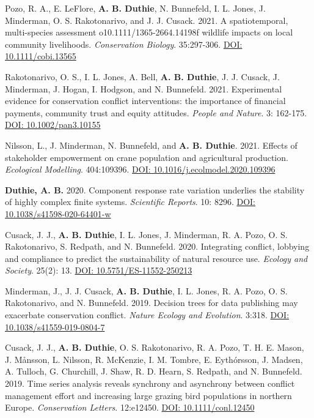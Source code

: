 \documentclass[letterpaper]{article}
\begin{document}
\begin{etaremune}
\item Pozo, R. A., E. LeFlore, {\bf A. B. Duthie}, N. Bunnefeld, I. L. Jones, J. Minderman, O. S. Rakotonarivo, and J. J. Cusack. 2021. A spatiotemporal, multi-species assessment o10.1111/1365-2664.14198f wildlife impacts on local community livelihoods. {\it Conservation Biology}. 35:297-306. \href{https://doi.org/10.1111/cobi.13565} {DOI: 10.1111/cobi.13565}
\item Rakotonarivo, O. S., I. L. Jones, A. Bell, {\bf A. B. Duthie}, J. J. Cusack, J. Minderman, J. Hogan, I. Hodgson, and N. Bunnefeld. 2021. Experimental evidence for conservation conflict interventions: the importance of financial payments, community trust and equity attitudes. {\it People and Nature}. 3: 162-175. \href{https://doi.org/10.1002/pan3.10155}{DOI: 10.1002/pan3.10155}
\item Nilsson, L., J. Minderman, N. Bunnefeld, and {\bf A. B. Duthie}. 2021. Effects of stakeholder empowerment on crane population and agricultural production. {\it Ecological Modelling}. 404:109396. \href{https://doi.org/10.1016/j.ecolmodel.2020.109396}{DOI: 10.1016/j.ecolmodel.2020.109396}
\item {\bf Duthie, A. B.} 2020. Component response rate variation underlies the stability of highly complex finite systems. {\it Scientific Reports}. 10: 8296. \href{https://www.nature.com/articles/s41598-020-64401-w}{DOI: 10.1038/s41598-020-64401-w}
\item Cusack, J. J., {\bf A. B. Duthie}, I. L. Jones, J. Minderman, R. A. Pozo, O. S. Rakotonarivo, S. Redpath, and N. Bunnefeld. 2020. Integrating conflict, lobbying and compliance to predict the sustainability of natural resource use. {\it Ecology and Society}. 25(2): 13. \href{https://doi.org/10.5751/ES-11552-250213}{DOI: 10.5751/ES-11552-250213}
\item Minderman, J., J. J. Cusack, {\bf A. B. Duthie}, I. L. Jones, R. A. Pozo, O. S. Rakotonarivo, and N. Bunnefeld. 2019. Decision trees for data publishing may exacerbate conservation conflict. {\it Nature Ecology and Evolution}. 3:318. \href{https://doi.org/10.1038/s41559-019-0804-7}{DOI: 10.1038/s41559-019-0804-7}
\item Cusack, J. J., {\bf A. B. Duthie}, O. S. Rakotonarivo, R. A. Pozo, T. H. E. Mason, J. M\r{a}nsson, L. Nilsson, R. McKenzie, I. M. Tombre, E. Eyth\'{o}rsson, J. Madsen, A. Tulloch, G. Churchill, J. Shaw, R. D. Hearn, S. Redpath, and N. Bunnefeld. 2019. Time series analysis reveals synchrony and asynchrony between conflict management effort and increasing large grazing bird populations in northern Europe. {\it Conservation Letters}. 12:e12450. \href{http://onlinelibrary.wiley.com/doi/10.1111/conl.12450/full}{DOI: 10.1111/conl.12450}

\end{etaremune}
\end{document}
